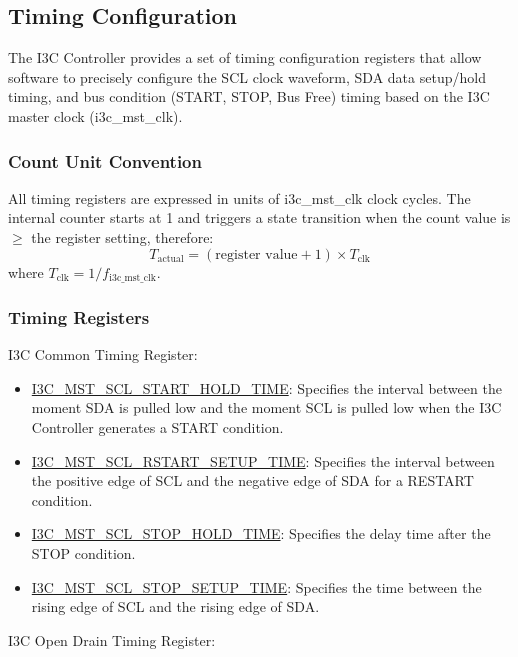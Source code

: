 \documentclass[main\_\_EN.tex]{subfiles}
\begin{document}
\subsection{Timing Configuration}
The I3C Controller provides a set of timing configuration registers that allow software to precisely configure the SCL clock waveform, SDA data setup/hold timing, and bus condition (START, STOP, Bus Free) timing based on the I3C master clock (i3c\_mst\_clk).

\subsubsection{Count Unit Convention}
All timing registers are expressed in units of i3c\_mst\_clk clock cycles. The internal counter starts at 1 and triggers a state transition when the count value is $\geq$ the register setting, therefore:
\begin{equation}
    T_\text{actual} = (\text{register value} + 1) \times T_\text{clk}
    \label{eq:timing_unit}
\end{equation}
where $T_\text{clk} = 1/f_\mathrm{i3c\_mst\_clk}$.
\subsubsection{Timing Registers}
I3C Common Timing Register:
\begin{itemize}
    \item \hyperref[fielddesc:I3CMSTREGSCLSTARTHOLDTIME]{I3C\_MST\_SCL\_START\_HOLD\_TIME}: Specifies the interval between the moment SDA is pulled low and the moment SCL is pulled low when the I3C Controller generates a START condition.
    \item \hyperref[fielddesc:I3CMSTREGSCLRSTARTSETUPTIME]{I3C\_MST\_SCL\_RSTART\_SETUP\_TIME}: Specifies the interval between the positive edge of SCL and the negative edge of SDA for a RESTART condition.
    \item \hyperref[fielddesc:I3CMSTREGSCLSTOPHOLDTIME]{I3C\_MST\_SCL\_STOP\_HOLD\_TIME}: Specifies the delay time after the STOP condition.
    \item \hyperref[fielddesc:I3CMSTREGSCLSTOPSETUPTIME]{I3C\_MST\_SCL\_STOP\_SETUP\_TIME}: Specifies the time between the rising edge of SCL and the rising edge of SDA.
\end{itemize}

I3C Open Drain Timing Register:
\end{document}
